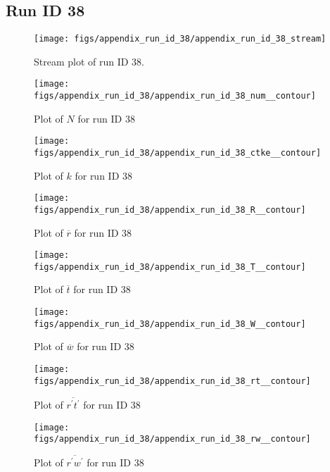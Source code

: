 \subsection{Run ID 38}
\begin{figure}[H]
\centering
\texttt{[image: figs/appendix\_run\_id\_38/appendix\_run\_id\_38\_stream]}
\caption{Stream plot of run ID 38.}
\label{fig:appendix_run_id_38_stream}
\end{figure}


\begin{figure}[H]
\centering
\texttt{[image: figs/appendix\_run\_id\_38/appendix\_run\_id\_38\_num\_\_contour]}
\caption{Plot of $N$ for run ID 38}
\label{fig:appendix_run_id_38_num__contour}
\end{figure}


\begin{figure}[H]
\centering
\texttt{[image: figs/appendix\_run\_id\_38/appendix\_run\_id\_38\_ctke\_\_contour]}
\caption{Plot of $k$ for run ID 38}
\label{fig:appendix_run_id_38_ctke__contour}
\end{figure}


\begin{figure}[H]
\centering
\texttt{[image: figs/appendix\_run\_id\_38/appendix\_run\_id\_38\_R\_\_contour]}
\caption{Plot of $\overline{r}$ for run ID 38}
\label{fig:appendix_run_id_38_R__contour}
\end{figure}


\begin{figure}[H]
\centering
\texttt{[image: figs/appendix\_run\_id\_38/appendix\_run\_id\_38\_T\_\_contour]}
\caption{Plot of $\overline{t}$ for run ID 38}
\label{fig:appendix_run_id_38_T__contour}
\end{figure}


\begin{figure}[H]
\centering
\texttt{[image: figs/appendix\_run\_id\_38/appendix\_run\_id\_38\_W\_\_contour]}
\caption{Plot of $\overline{w}$ for run ID 38}
\label{fig:appendix_run_id_38_W__contour}
\end{figure}


\begin{figure}[H]
\centering
\texttt{[image: figs/appendix\_run\_id\_38/appendix\_run\_id\_38\_rt\_\_contour]}
\caption{Plot of $\overline{r^\prime t^\prime}$ for run ID 38}
\label{fig:appendix_run_id_38_rt__contour}
\end{figure}


\begin{figure}[H]
\centering
\texttt{[image: figs/appendix\_run\_id\_38/appendix\_run\_id\_38\_rw\_\_contour]}
\caption{Plot of $\overline{r^\prime w^\prime}$ for run ID 38}
\label{fig:appendix_run_id_38_rw__contour}
\end{figure}


